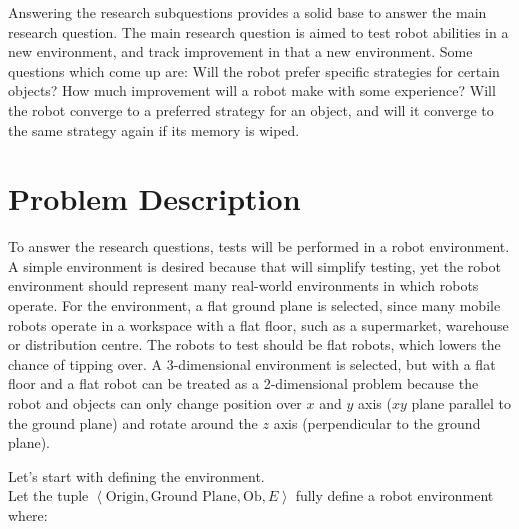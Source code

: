 Answering the research subquestions provides a solid base to answer the main research question. The main research question is aimed to test robot abilities in a new environment, and track improvement in that a new environment. Some questions which come up are: Will the robot prefer specific strategies for certain objects? How much improvement will a robot make with some experience? Will the robot converge to a preferred strategy for an object, and will it converge to the same strategy again if its memory is wiped.\bs

\section{Problem Description}%
\label{sec:problem_description}
To answer the research questions, tests will be performed in a robot environment. A simple environment is desired because that will simplify testing, yet the robot environment should represent many real-world environments in which robots operate. For the environment, a flat ground plane is selected, since many mobile robots operate in a workspace with a flat floor, such as a supermarket, warehouse or distribution centre. The robots to test should be flat robots, which lowers the chance of tipping over. A 3-dimensional environment is selected, but with a flat floor and a flat robot can be treated as a 2-dimensional problem because the robot and objects can only change position over $x$ and $y$ axis ($xy$ plane parallel to the ground plane) and rotate around the $z$ axis (perpendicular to the ground plane).\bs

Let's start with defining the environment.\\Let the tuple $\left\langle \text{Origin}, \text{Ground Plane}, \text{Ob}, E \right\rangle$ fully define a robot environment where:\bs

